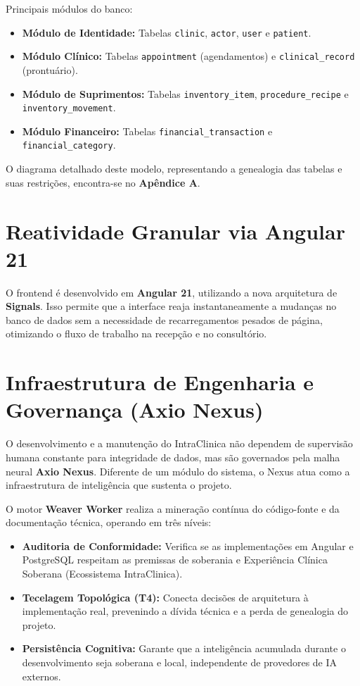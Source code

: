 Principais módulos do banco:
\begin{itemize}
    \item \textbf{Módulo de Identidade:} Tabelas \texttt{clinic}, \texttt{actor}, \texttt{user} e \texttt{patient}.
    \item \textbf{Módulo Clínico:} Tabelas \texttt{appointment} (agendamentos) e \texttt{clinical\_record} (prontuário).
    \item \textbf{Módulo de Suprimentos:} Tabelas \texttt{inventory\_item}, \texttt{procedure\_recipe} e \texttt{inventory\_movement}.
    \item \textbf{Módulo Financeiro:} Tabelas \texttt{financial\_transaction} e \texttt{financial\_category}.
\end{itemize}

O diagrama detalhado deste modelo, representando a genealogia das tabelas e suas restrições, encontra-se no \textbf{Apêndice A}.

\section{Reatividade Granular via Angular 21}

O frontend é desenvolvido em \textbf{Angular 21}, utilizando a nova arquitetura de \textbf{Signals}. Isso permite que a interface reaja instantaneamente a mudanças no banco de dados sem a necessidade de recarregamentos pesados de página, otimizando o fluxo de trabalho na recepção e no consultório.

\section{Infraestrutura de Engenharia e Governança (Axio Nexus)}

O desenvolvimento e a manutenção do IntraClinica não dependem de supervisão humana constante para integridade de dados, mas são governados pela malha neural \textbf{Axio Nexus}. Diferente de um módulo do sistema, o Nexus atua como a infraestrutura de inteligência que sustenta o projeto.

O motor \textbf{Weaver Worker} realiza a mineração contínua do código-fonte e da documentação técnica, operando em três níveis:
\begin{itemize}
    \item \textbf{Auditoria de Conformidade:} Verifica se as implementações em Angular e PostgreSQL respeitam as premissas de soberania e Experiência Clínica Soberana (Ecossistema IntraClinica).
    \item \textbf{Tecelagem Topológica (T4):} Conecta decisões de arquitetura à implementação real, prevenindo a dívida técnica e a perda de genealogia do projeto.
    \item \textbf{Persistência Cognitiva:} Garante que a inteligência acumulada durante o desenvolvimento seja soberana e local, independente de provedores de IA externos.
\end{itemize}
